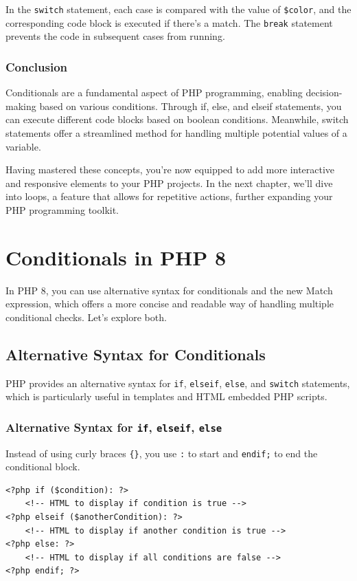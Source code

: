 \documentclass[11pt]{article}
\begin{document}
In the \texttt{switch} statement, each case is compared with the value of
\texttt{\$color}, and the corresponding code block is executed if there's a
match. The \texttt{break} statement prevents the code in subsequent cases from
running.

\subsubsection{Conclusion}
\label{sec:orgb7bb211}
Conditionals are a fundamental aspect of PHP programming, enabling
decision-making based on various conditions. Through if, else, and
elseif statements, you can execute different code blocks based on
boolean conditions. Meanwhile, switch statements offer a streamlined
method for handling multiple potential values of a variable.

Having mastered these concepts, you're now equipped to add more
interactive and responsive elements to your PHP projects. In the next
chapter, we'll dive into loops, a feature that allows for repetitive
actions, further expanding your PHP programming toolkit.

\section{Conditionals in PHP 8}
\label{sec:org5b76f72}
In PHP 8, you can use alternative syntax for conditionals and the new
Match expression, which offers a more concise and readable way of
handling multiple conditional checks. Let's explore both.

\subsection{Alternative Syntax for Conditionals}
\label{sec:org14b5e28}
PHP provides an alternative syntax for \texttt{if}, \texttt{elseif}, \texttt{else}, and
\texttt{switch} statements, which is particularly useful in templates and HTML
embedded PHP scripts.

\subsubsection{Alternative Syntax for \texttt{if}, \texttt{elseif}, \texttt{else}}
\label{sec:org2a59c5e}
Instead of using curly braces \texttt{\{\}}, you use \texttt{:} to start and \texttt{endif;} to
end the conditional block.

\begin{verbatim}
<?php if ($condition): ?>
    <!-- HTML to display if condition is true -->
<?php elseif ($anotherCondition): ?>
    <!-- HTML to display if another condition is true -->
<?php else: ?>
    <!-- HTML to display if all conditions are false -->
<?php endif; ?>
\end{verbatim}
\end{document}
